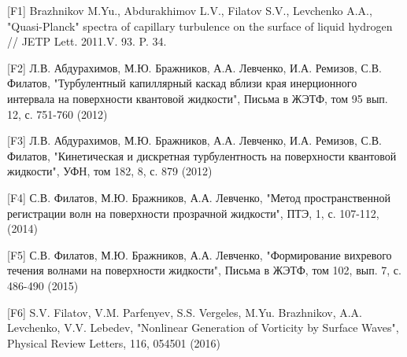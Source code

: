 \clearpage                                  %



[F1] Brazhnikov M.Yu., Abdurakhimov L.V., Filatov S.V., Levchenko A.A., "Quasi-Planck"  spectra of capillary turbulence on the surface of liquid hydrogen // JETP Lett. 2011.V. 93. P. 34.

[F2] Л.В. Абдурахимов, М.Ю. Бражников, А.А. Левченко, И.А. Ремизов, С.В. Филатов, "Турбулентный капиллярный каскад вблизи края инерционного интервала на поверхности квантовой жидкости", Письма в ЖЭТФ, том 95 вып. 12, с. 751-760 (2012)

[F3] Л.В. Абдурахимов, М.Ю. Бражников, А.А. Левченко, И.А. Ремизов, С.В. Филатов, "Кинетическая и дискретная турбулентность на поверхности квантовой жидкости", УФН, том 182, 8, с. 879 (2012)

[F4] С.В. Филатов, М.Ю. Бражников, А.А. Левченко, "Метод пространственной регистрации волн на поверхности прозрачной жидкости", ПТЭ, 1, с. 107-112, (2014)

[F5] С.В. Филатов, М.Ю. Бражников, А.А. Левченко, "Формирование вихревого течения волнами на поверхности жидкости", Письма в ЖЭТФ, том 102, вып. 7, с. 486-490 (2015)

[F6] S.V. Filatov, V.M. Parfenyev, S.S. Vergeles, M.Yu. Brazhnikov, A.A. Levchenko, V.V. Lebedev, "Nonlinear Generation of Vorticity by Surface Waves", Physical Review Letters, 116, 054501 (2016)

